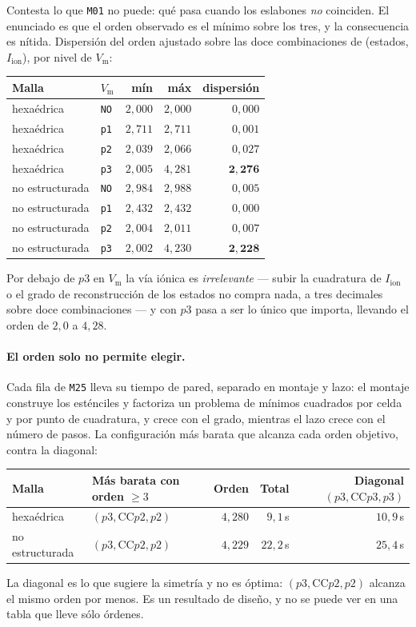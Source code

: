 \documentclass[11pt,a4paper]{article}
\newcommand{\code}[1]{\texttt{\small #1}}
\newcommand{\Vm}{V_{\text{m}}}
\newcommand{\Iion}{I_{\mathrm{ion}}}
\begin{document}
Contesta lo que \code{M01} no puede: qué pasa cuando los eslabones \emph{no}
coinciden. El enunciado es que el orden observado es el mínimo sobre los tres, y la
consecuencia es nítida. Dispersión del orden ajustado sobre las doce combinaciones
de (estados, $\Iion$), por nivel de $\Vm$:
\begin{center}
\begin{tabular}{@{}llrrr@{}}
\toprule
Malla & $\Vm$ & mín & máx & dispersión \\
\midrule
hexaédrica       & \code{NO} & $2{,}000$ & $2{,}000$ & $0{,}000$ \\
hexaédrica       & \code{p1} & $2{,}711$ & $2{,}711$ & $0{,}001$ \\
hexaédrica       & \code{p2} & $2{,}039$ & $2{,}066$ & $0{,}027$ \\
hexaédrica       & \code{p3} & $2{,}005$ & $4{,}281$ & $\mathbf{2{,}276}$ \\
no estructurada  & \code{NO} & $2{,}984$ & $2{,}988$ & $0{,}005$ \\
no estructurada  & \code{p1} & $2{,}432$ & $2{,}432$ & $0{,}000$ \\
no estructurada  & \code{p2} & $2{,}004$ & $2{,}011$ & $0{,}007$ \\
no estructurada  & \code{p3} & $2{,}002$ & $4{,}230$ & $\mathbf{2{,}228}$ \\
\bottomrule
\end{tabular}
\end{center}
Por debajo de $p3$ en $\Vm$ la vía iónica es \emph{irrelevante} --- subir la
cuadratura de $\Iion$ o el grado de reconstrucción de los estados no compra nada, a
tres decimales sobre doce combinaciones --- y con $p3$ pasa a ser lo único que
importa, llevando el orden de $2{,}0$ a $4{,}28$.

\paragraph{El orden solo no permite elegir.} Cada fila de \code{M25} lleva su
tiempo de pared, separado en montaje y lazo: el montaje construye los esténciles y
factoriza un problema de mínimos cuadrados por celda y por punto de cuadratura, y
crece con el grado, mientras el lazo crece con el número de pasos. La configuración
más barata que alcanza cada orden objetivo, contra la diagonal:
\begin{center}
\begin{tabular}{@{}llrrr@{}}
\toprule
Malla & Más barata con orden $\geq 3$ & Orden & Total & Diagonal $(p3,\mathrm{CC}p3,p3)$ \\
\midrule
hexaédrica      & $(p3,\mathrm{CC}p2,p2)$ & $4{,}280$ & $9{,}1$\,s  & $10{,}9$\,s \\
no estructurada & $(p3,\mathrm{CC}p2,p2)$ & $4{,}229$ & $22{,}2$\,s & $25{,}4$\,s \\
\bottomrule
\end{tabular}
\end{center}
La diagonal es lo que sugiere la simetría y no es óptima: $(p3,\mathrm{CC}p2,p2)$
alcanza el mismo orden por menos. Es un resultado de diseño, y no se puede ver en
una tabla que lleve sólo órdenes.
\end{document}
